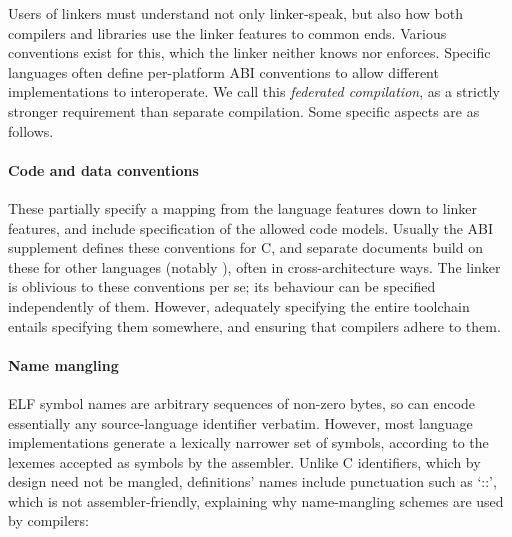 Users of linkers must understand not only linker-speak, but also 
how both compilers and libraries use the linker features to common ends.
Various conventions exist for this, which the linker neither knows nor enforces.
Specific languages often define per-platform ABI conventions to
allow different implementations to interoperate.
We call this \emph{federated compilation}, as a strictly stronger 
requirement than separate compilation.
Some specific aspects are as follows.

\paragraph{Code and data conventions} 
These partially specify a mapping from the language features down to linker features,
and include specification of the allowed code models.
Usually the ABI supplement defines these conventions for C,
and separate documents build on these for other languages (notably \Cplusplus{}), 
often in cross-architecture ways.
The linker is oblivious to these conventions per se; 
its behaviour can be specified independently of them. 
However, adequately specifying the entire toolchain entails
specifying them somewhere, and ensuring that compilers adhere to them.

\paragraph{Name mangling}
ELF symbol names are arbitrary sequences of non-zero bytes, so can encode 
essentially any source-language identifier verbatim. However, 
most language implementations generate a lexically narrower set of symbols,
according to the lexemes accepted as symbols by the assembler.
Unlike C identifiers, which by design need not be mangled, 
\Cplusplus{} definitions' names include punctuation such as `\textsf{::}', 
which is not assembler-friendly,
explaining why name-mangling schemes are used by \Cplusplus{} compilers: 

